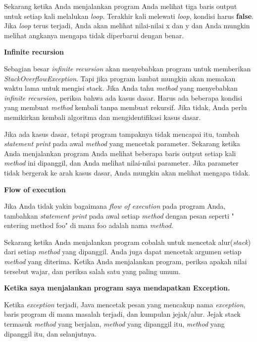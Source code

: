 \noindent Sekarang ketika Anda menjalankan program Anda melihat tiga baris output untuk setiap kali melalukan \textit{loop}. Terakhir kali melewati \textit{loop}, kondisi harus \textbf{false}. Jika \textit{loop} terus terjadi, Anda akan melihat nilai-nilai x dan y dan Anda mungkin melihat angkanya mengapa tidak diperbarui dengan benar.

\noindent \textbf{Infinite recursion}

\noindent Sebagian besar \textit{infinite recursion} akan menyebabkan program untuk memberikan \textit{StackOverflowException}. Tapi jika program lambat mungkin akan memakan waktu lama untuk mengisi stack.
Jika Anda tahu \textit{method} yang menyebabkan \textit{infinite recursion}, periksa bahwa ada kasus dasar. Harus ada beberapa kondisi yang membuat \textit{method} kembali tanpa membuat rekursif. Jika tidak, Anda perlu memikirkan kembali algoritma dan mengidentifikasi kasus dasar.

\noindent Jika ada kasus dasar, tetapi program tampaknya tidak mencapai itu, tambah \textit{statement print} pada awal \textit{method} yang mencetak parameter. Sekarang ketika Anda menjalankan program Anda melihat beberapa baris output setiap kali \textit{method} ini dipanggil, dan Anda melihat nilai-nilai parameter. Jika parameter tidak bergerak ke arah kasus dasar, Anda mungkin akan melihat mengapa tidak.

\noindent \textbf{Flow of execution}

\noindent Jika Anda tidak yakin bagaimana \textit{flow of execution} pada program Anda, tambahkan \textit{statement print} pada awal setiap \textit{method} dengan pesan seperti " entering method foo" di mana foo adalah nama \textit{method}.

\noindent Sekarang ketika Anda menjalankan program cobalah untuk mencetak alur(\textit{stack}) dari setiap \textit{method} yang dipanggil. Anda juga dapat mencetak argumen setiap \textit{method} yang diterima. Ketika Anda menjalankan program, periksa apakah nilai tersebut wajar, dan periksa salah satu yang paling umum.

\noindent \textbf{Ketika saya menjalankan program saya mendapatkan Exception.}

\noindent Ketika \textit{exception} terjadi, Java mencetak pesan yang mencakup nama \textit{exception}, baris program di mana masalah terjadi, dan kumpulan jejak/alur. Jejak stack termasuk \textit{method} yang berjalan, \textit{method} yang dipanggil itu, \textit{method} yang dipanggil itu, dan selanjutnya.

